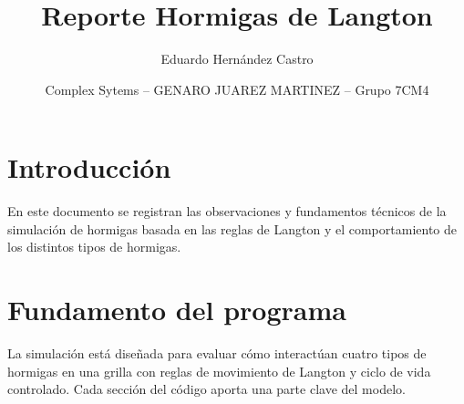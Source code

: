 \documentclass[12pt,a4paper]{article}
\title{Reporte Hormigas de Langton}
\author{Eduardo Hernández Castro}
\date{Complex Sytems -- GENARO JUAREZ MARTINEZ -- Grupo 7CM4}
\begin{document}
\maketitle

\section{Introducción}
En este documento se registran las observaciones y fundamentos técnicos de la simulación de hormigas basada en las reglas de Langton y el comportamiento de los distintos tipos de hormigas.

\section{Fundamento del programa}
La simulación está diseñada para evaluar cómo interactúan cuatro tipos de hormigas en una grilla con reglas de movimiento de Langton y ciclo de vida controlado. Cada sección del código aporta una parte clave del modelo.
\end{document}
